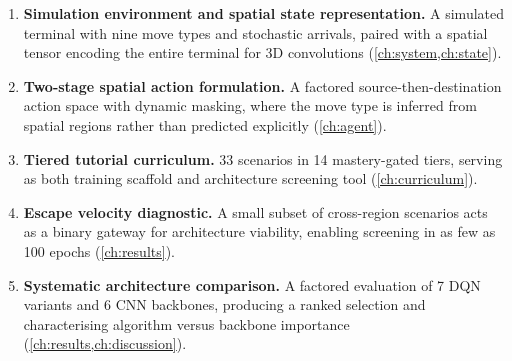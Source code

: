 \begin{enumerate}[label=(\arabic*)]
  \item \textbf{Simulation environment and spatial state representation.} A simulated terminal with nine move types and stochastic arrivals, paired with a spatial tensor encoding the entire terminal for 3D convolutions (\cref{ch:system,ch:state}).

  \item \textbf{Two-stage spatial action formulation.} A factored source-then-destination action space with dynamic masking, where the move type is inferred from spatial regions rather than predicted explicitly (\cref{ch:agent}).

  \item \textbf{Tiered tutorial curriculum.} 33 scenarios in 14 mastery-gated tiers, serving as both training scaffold and architecture screening tool (\cref{ch:curriculum}).

  \item \textbf{Escape velocity diagnostic.} A small subset of cross-region scenarios acts as a binary gateway for architecture viability, enabling screening in as few as 100 epochs (\cref{ch:results}).

  \item \textbf{Systematic architecture comparison.} A factored evaluation of 7 DQN variants and 6 CNN backbones, producing a ranked selection and characterising algorithm versus backbone importance (\cref{ch:results,ch:discussion}).
\end{enumerate}
